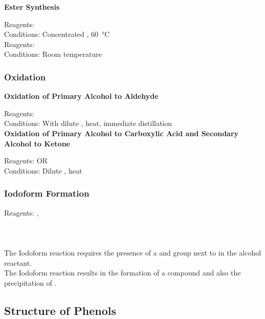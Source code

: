 \documentclass[../main]{subfiles}
\begin{document}
	\noindent \textbf{Ester Synthesis}

	Reagents:  \\
	Conditions:  Concentrated , \SI{60}{\celsius} \\

	Reagents:  \\
	Conditions:  Room temperature \\

	\subsubsection{Oxidation}

	\noindent \textbf{Oxidation of Primary Alcohol to Aldehyde}

	Reagents:  \\
	Conditions: With dilute , heat, immediate distillation \\

	\noindent \textbf{Oxidation of Primary Alcohol to Carboxylic Acid and Secondary Alcohol to Ketone}

	Reagents:  OR  \\
	Conditions: Dilute , heat \\

	\subsubsection{Iodoform Formation}

	Reagents: ,  \\

	 \\
	 \\
	 \\

	The Iodoform reaction requires the presence of a  and  group next to  in the alcohol reactant. \\

	The Iodoform reaction results in the formation of a  compound and also the precipitation of . \\

	\subsection{Structure of Phenols}
\end{document}
